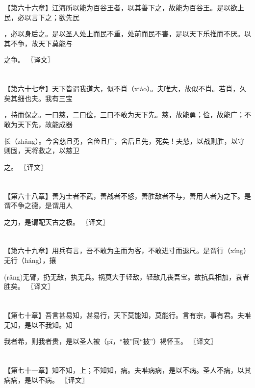 \documentclass[a4paper,12pt,UTF8,twoside]{ctexbook}
\begin{document}
	【第六十六章】江海所以能为百谷王者，以其善下之，故能为百谷王。是以欲上民，必以言下之；欲先民
	
	，必以身后之。是以圣人处上而民不重，处前而民不害，是以天下乐推而不厌。以其不争，故天下莫能与
	
	之争。 〖译文〗
	
	\chapter{}	
	
	【第六十七章】天下皆谓我道大，似不肖（xiào）。夫唯大，故似不肖。若肖，久矣其细也夫。我有三宝
	
	，持而保之。一曰慈，二曰俭，三曰不敢为天下先。慈，故能勇；俭，故能广；不敢为天下先，故能成器
	
	长（zhǎng）。今舍慈且勇，舍俭且广，舍后且先，死矣！夫慈，以战则胜，以守则固，天将救之，以慈卫
	
	之。 〖译文〗
	
	\chapter{}	
	
	【第六十八章】善为士者不武，善战者不怒，善胜敌者不与，善用人者为之下。是谓不争之德，是谓用人
	
	之力，是谓配天古之极。 〖译文〗
	
	\chapter{}	
	
	【第六十九章】用兵有言，吾不敢为主而为客，不敢进寸而退尺。是谓行（xíng）无行（háng），攘
	
	(rǎng)无臂，扔无敌，执无兵。祸莫大于轻敌，轻敌几丧吾宝。故抗兵相加，哀者胜矣。 〖译文〗
	
	\chapter{}	
	
	【第七十章】吾言甚易知，甚易行，天下莫能知，莫能行。言有宗，事有君。夫唯无知，是以不我知。知
	
	我者希，则我者贵，是以圣人被（pī，“被”同“披”）褐怀玉。 〖译文〗
	
	\chapter{}	
	
	【第七十一章】知不知，上；不知知，病。夫唯病病，是以不病。圣人不病，以其病病，是以不病。 〖译文〗
	
\end{document}
